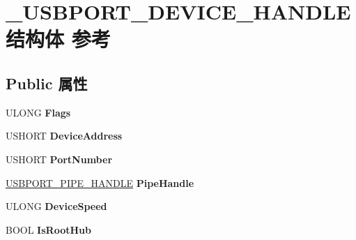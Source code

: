 \hypertarget{struct___u_s_b_p_o_r_t___d_e_v_i_c_e___h_a_n_d_l_e}{}\section{\+\_\+\+U\+S\+B\+P\+O\+R\+T\+\_\+\+D\+E\+V\+I\+C\+E\+\_\+\+H\+A\+N\+D\+L\+E结构体 参考}
\label{struct___u_s_b_p_o_r_t___d_e_v_i_c_e___h_a_n_d_l_e}
\subsection*{Public 属性}
\begin{DoxyCompactItemize}
\item 
\mbox{\label{struct___u_s_b_p_o_r_t___d_e_v_i_c_e___h_a_n_d_l_e_abadee6a2332df2c9368f0ceaf611a3d1}} 
U\+L\+O\+NG {\bfseries Flags}
\item 
\mbox{\label{struct___u_s_b_p_o_r_t___d_e_v_i_c_e___h_a_n_d_l_e_ab6637f639f23d0911ac150251a3a728a}} 
U\+S\+H\+O\+RT {\bfseries Device\+Address}
\item 
\mbox{\label{struct___u_s_b_p_o_r_t___d_e_v_i_c_e___h_a_n_d_l_e_aa7287d3b95737b8385bdc748edf54d5b}} 
U\+S\+H\+O\+RT {\bfseries Port\+Number}
\item 
\mbox{\label{struct___u_s_b_p_o_r_t___d_e_v_i_c_e___h_a_n_d_l_e_a6c2420e2992262289370e4eecfddb8b7}} 
\hyperlink{struct___u_s_b_p_o_r_t___p_i_p_e___h_a_n_d_l_e}{U\+S\+B\+P\+O\+R\+T\+\_\+\+P\+I\+P\+E\+\_\+\+H\+A\+N\+D\+LE} {\bfseries Pipe\+Handle}
\item 
\mbox{\label{struct___u_s_b_p_o_r_t___d_e_v_i_c_e___h_a_n_d_l_e_ace512d74a6d2b86ef1d09d2ea000953d}} 
U\+L\+O\+NG {\bfseries Device\+Speed}
\item 
\mbox{\label{struct___u_s_b_p_o_r_t___d_e_v_i_c_e___h_a_n_d_l_e_a0473ab91e652c9aceebc824a2ebb143c}} 
B\+O\+OL {\bfseries Is\+Root\+Hub}
\item 

\end{DoxyCompactItemize}
